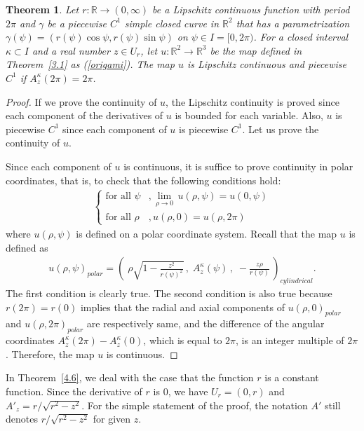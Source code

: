 \documentclass{amsart}
\theoremstyle{plain}
\newtheorem{theorem}{Theorem}[section]
\theoremstyle{definition}
\theoremstyle{remark}
\begin{document}
\begin{theorem}\label{4.5} %
Let $r \colon \mathbb{R}\to(0,\infty)$ be a Lipschitz continuous function with period $2\pi$ and $\gamma$ be a piecewise $C^1$ simple closed curve in $\mathbb{R}^2$ that has a parametrization $\gamma(\psi)=(r(\psi)\cos\psi,r(\psi)\sin\psi)$ on $\psi\in I=[0,2\pi)$. 
For a closed interval $\kappa\subset I$ and a real number $z\in U_r$, let $u \colon \mathbb{R}^2\to\mathbb{R}^3$ be the map defined in Theorem~\ref{3.1} as (\ref{origami}).
The map $u$ is Lipschitz continuous and piecewise $C^1$ if $A_z^{\kappa}(2\pi)=2\pi$.
\end{theorem}

\begin{proof}
If we prove the continuity of $u$, the Lipschitz continuity is proved since each component of the derivatives of $u$ is bounded for each variable.
Also, $u$ is piecewise $C^1$ since each component of $u$ is piecewise $C^1$.
Let us prove the continuity of $u$.

Since each component of $u$ is continuous, it is suffice to prove continuity in polar coordinates, 
that is, to check that the following conditions hold:
\begin{align*}
\begin{cases}
\text{for all $\psi$}&,\displaystyle{\lim_{\rho\to0}}\,u(\rho,\psi)=u(0,\psi) \\
\text{for all $\rho$}&,u(\rho,0)=u(\rho,2\pi)
\end{cases}
\end{align*}
where $u(\rho,\psi)$ is defined on a polar coordinate system.
Recall that the map $u$ is defined as
\begin{align*}
u(\rho,\psi)_{polar}=\left(\;\rho\sqrt{1-\frac{z^2}{r(\psi)^2}}\,,
\;A_z^{\kappa}(\psi)\,,
\;-\frac{z\rho}{r(\psi)}\,\right)_{cylindrical}. %
\end{align*}
The first condition is clearly true.
The second condition is also true because $r(2\pi)=r(0)$ implies that the radial and axial components of $u(\rho,0)_{polar}$ and $u(\rho,2\pi)_{polar}$ are respectively same, and the difference of the angular coordinates $A_z^{\kappa}(2\pi)-A_z^{\kappa}(0)$, which is equal to $2\pi$, is an integer multiple of $2\pi$.
Therefore, the map $u$ is continuous.
\end{proof}




In Theorem~\ref{4.6}, we deal with the case that the function $r$ is a constant function.
Since the derivative of $r$ is $0$, we have $U_r=(0,r)$ and $A'_z=r/\sqrt{r^2-z^2}$.
For the simple statement of the proof, the notation $A'$ still denotes $r/\sqrt{r^2-z^2}$ for given $z$.
\end{document}
